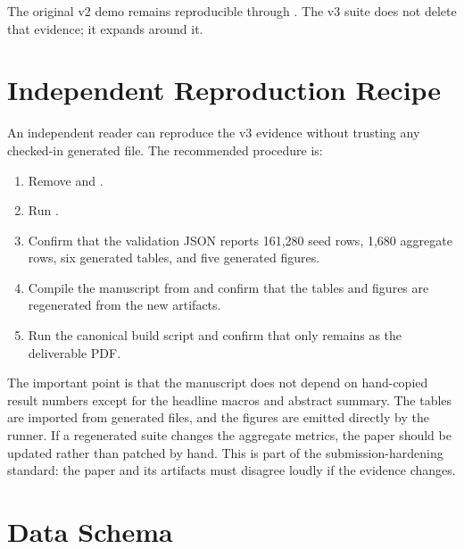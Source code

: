 \documentclass{article}
\newcommand{\seedrows}{161,280}
\newcommand{\aggrows}{1,680}
\begin{document}
The original v2 demo remains reproducible through . The v3 suite does not delete that evidence; it expands around it.

\section{Independent Reproduction Recipe}

An independent reader can reproduce the v3 evidence without trusting any checked-in generated file. The recommended procedure is:
\begin{enumerate}
    \item Remove  and .
    \item Run .
    \item Confirm that the validation JSON reports \seedrows{} seed rows, \aggrows{} aggregate rows, six generated tables, and five generated figures.
    \item Compile the manuscript from  and confirm that the tables and figures are regenerated from the new artifacts.
    \item Run the canonical build script and confirm that only  remains as the deliverable PDF.
\end{enumerate}

The important point is that the manuscript does not depend on hand-copied result numbers except for the headline macros and abstract summary. The tables are imported from generated files, and the figures are emitted directly by the runner. If a regenerated suite changes the aggregate metrics, the paper should be updated rather than patched by hand. This is part of the submission-hardening standard: the paper and its artifacts must disagree loudly if the evidence changes.

\section{Data Schema}
\end{document}
